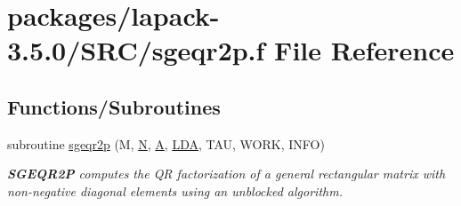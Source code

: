 \hypertarget{sgeqr2p_8f}{}\section{packages/lapack-\/3.5.0/\+S\+R\+C/sgeqr2p.f File Reference}
\label{sgeqr2p_8f}
\subsection*{Functions/\+Subroutines}
\begin{DoxyCompactItemize}
\item 
subroutine \hyperlink{group__realGEcomputational_ga8979d77a9ad2c9791bd813c2fe3f954e}{sgeqr2p} (M, \hyperlink{polmisc_8c_a0240ac851181b84ac374872dc5434ee4}{N}, \hyperlink{classA}{A}, \hyperlink{example__user_8c_ae946da542ce0db94dced19b2ecefd1aa}{L\+D\+A}, T\+A\+U, W\+O\+R\+K, I\+N\+F\+O)
\begin{DoxyCompactList}\small\item\em {\bfseries S\+G\+E\+Q\+R2\+P} computes the Q\+R factorization of a general rectangular matrix with non-\/negative diagonal elements using an unblocked algorithm. \end{DoxyCompactList}\end{DoxyCompactItemize}
